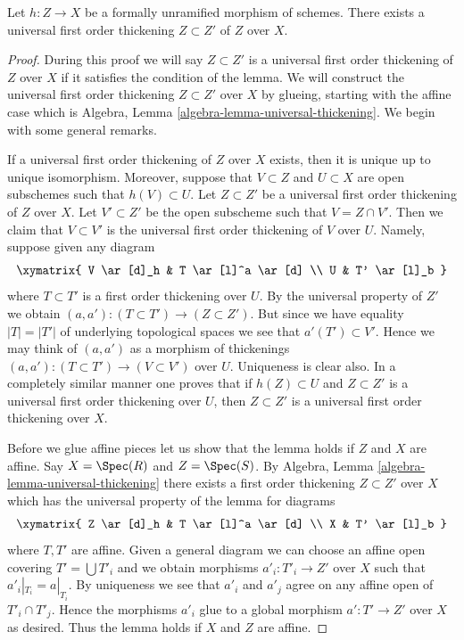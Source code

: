%
\begin{lemma}
\label{lemma-universal-thickening}
Let $h : Z \to X$ be a formally unramified morphism of schemes.
There exists a universal first order thickening $Z \subset Z'$ of
$Z$ over $X$.
\end{lemma}

\begin{proof}
During this proof we will say $Z \subset Z'$ is a universal first order
thickening of $Z$ over $X$ if it satisfies the condition of the lemma.
We will construct the universal first order thickening $Z \subset Z'$ over $X$
by glueing, starting with the affine case which is
Algebra, Lemma \ref{algebra-lemma-universal-thickening}.
We begin with some general remarks.

\medskip\noindent
If a universal first order thickening of $Z$ over $X$ exists, then it is unique
up to unique isomorphism. Moreover, suppose that $V \subset Z$ and
$U \subset X$ are open subschemes such that $h(V) \subset U$. Let
$Z \subset Z'$ be a universal first order thickening of $Z$ over $X$.
Let $V' \subset Z'$ be the open subscheme such that $V = Z \cap V'$.
Then we claim that $V \subset V'$ is the universal first order thickening of
$V$ over $U$. Namely, suppose given any diagram
$$
\xymatrix{
V \ar[d]_h & T \ar[l]^a \ar[d] \\
U & T' \ar[l]_b
}
$$
where $T \subset T'$ is a first order thickening over $U$. By the universal
property of $Z'$ we obtain $(a, a') : (T \subset T') \to (Z \subset Z')$.
But since we have equality $|T| = |T'|$ of underlying topological spaces
we see that $a'(T') \subset V'$. Hence we may think of $(a, a')$
as a morphism of thickenings $(a, a') : (T \subset T') \to (V \subset V')$
over $U$. Uniqueness is clear also. In a completely similar manner one proves
that if $h(Z) \subset U$ and $Z \subset Z'$ is a universal first order
thickening over $U$, then $Z \subset Z'$ is a universal first order thickening
over $X$.

\medskip\noindent
Before we glue affine pieces let us show that the lemma holds if
$Z$ and $X$ are affine. Say $X = \Spec(R)$ and $Z = \Spec(S)$. By
Algebra, Lemma \ref{algebra-lemma-universal-thickening}
there exists a first order thickening $Z \subset Z'$ over $X$
which has the universal property of the lemma for diagrams
$$
\xymatrix{
Z \ar[d]_h & T \ar[l]^a \ar[d] \\
X & T' \ar[l]_b
}
$$
where $T, T'$ are affine. Given a general diagram we can choose an affine
open covering $T' = \bigcup T'_i$ and we obtain morphisms
$a'_i : T'_i \to Z'$ over $X$ such that $a'_i|_{T_i} = a|_{T_i}$.
By uniqueness we see that $a'_i$ and $a'_j$ agree on any affine open
of $T'_i \cap T'_j$. Hence the morphisms $a'_i$ glue to a global morphism
$a' : T' \to Z'$ over $X$ as desired. Thus the lemma holds if $X$ and $Z$
are affine.


\end{proof}
